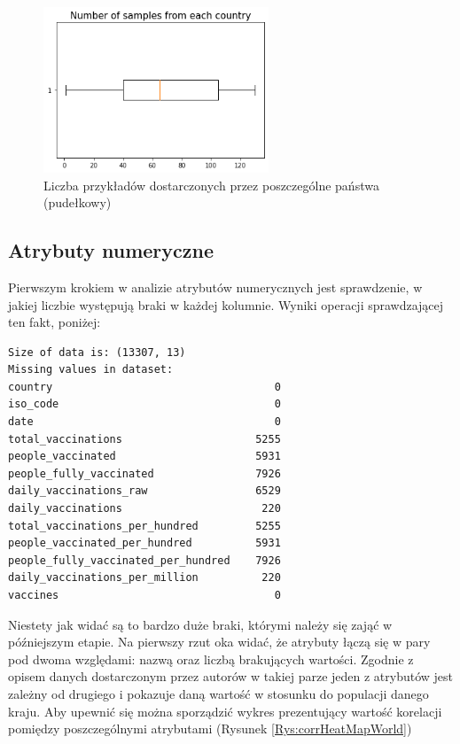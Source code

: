 \documentclass[12pt, oneside]{article}
\begin{document}
\begin{figure}[h]
\centering
\includegraphics[width=0.6\textwidth]{../img/boxplot_of_samples.png} 
\caption{Liczba przykładów dostarczonych przez poszczególne państwa (pudełkowy)}
\label{Rys:boxplotSamples}
\end{figure}






\subsection{Atrybuty numeryczne}

Pierwszym krokiem w analizie atrybutów numerycznych jest sprawdzenie, w jakiej liczbie występują braki w każdej kolumnie. Wyniki operacji sprawdzającej ten fakt, poniżej:

\begin{verbatim}
Size of data is: (13307, 13)
Missing values in dataset: 
country                                   0
iso_code                                  0
date                                      0
total_vaccinations                     5255
people_vaccinated                      5931
people_fully_vaccinated                7926
daily_vaccinations_raw                 6529
daily_vaccinations                      220
total_vaccinations_per_hundred         5255
people_vaccinated_per_hundred          5931
people_fully_vaccinated_per_hundred    7926
daily_vaccinations_per_million          220
vaccines                                  0
\end{verbatim}

Niestety jak widać są to bardzo duże braki, którymi należy się zająć w późniejszym etapie. Na pierwszy rzut oka widać, że atrybuty łączą się w pary pod dwoma względami: nazwą oraz liczbą brakujących wartości. Zgodnie z opisem danych dostarczonym przez autorów w takiej parze jeden z atrybutów jest zależny od drugiego i pokazuje daną wartość w stosunku do populacji danego kraju. Aby upewnić się można sporządzić wykres prezentujący wartość korelacji pomiędzy poszczególnymi atrybutami (Rysunek \ref{Rys:corrHeatMapWorld})
\end{document}
